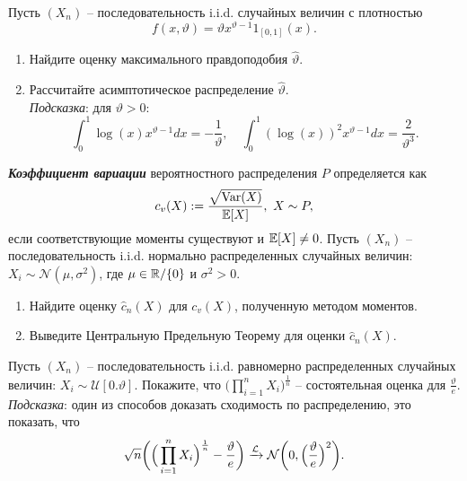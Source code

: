\begin{exc}
	Пусть $(X_n)$ -- последовательность i.i.d. случайных величин с плотностью
	\[ f(x, \vartheta) = \vartheta x^{\vartheta - 1} 1_{[0, 1]}(x). \]
	\begin{enumerate}
		\item Найдите оценку максимального правдоподобия $\hat{\vartheta}$.
		\item Рассчитайте асимптотическое распределение $\hat{\vartheta}$. \\
		\textit{Подсказка}: для $\vartheta > 0$:
		\[ \int_{0}^{1} \log(x) x^{\vartheta - 1} dx = -\frac{1}{\vartheta}, \quad \int_{0}^{1} (\log(x))^2x^{\vartheta - 1}dx = \frac{2}{\vartheta^3}.  \]
	\end{enumerate}
\end{exc}

\begin{exc}
	\textbf{\textit{Коэффициент вариации}} вероятностного распределения $P$ определяется как
	\[ c_v(X) := \frac{\sqrt{\mathrm{Var}(X)}}{\mathbb{E}[X]},\ X \sim P, \]
	если соответствующие моменты существуют и $\mathbb{E}[X] \neq 0$. Пусть $(X_n)$ -- последовательность i.i.d. нормально распределенных случайных величин: $X_i \sim \mathcal{N}(\mu, \sigma^2)$, где $\mu \in \mathbb{R} / \{0\}$ и $\sigma^2 > 0$.
	\begin{enumerate}
		\item Найдите оценку $\hat{c}_n(X)$ для $c_v(X)$, полученную методом моментов.
		\item Выведите Центральную Предельную Теорему для оценки $\hat{c}_n(X)$.
	\end{enumerate}
\end{exc}

\begin{exc}
	Пусть $(X_n)$ -- последовательность i.i.d. равномерно распределенных случайных величин: $X_i \sim \mathcal{U}[0. \vartheta]$. Покажите, что $\big(\prod_{i=1}^{n} X_i \big)^{\frac{1}{n}}$ -- состоятельная оценка для $\frac{\vartheta}{e}$.\\
	\subitem \textit{Подсказка}: один из способов доказать сходимость по распределению, это показать, что
	\[ \sqrt{n} \bigg(\Big(\prod_{i=1}^{n} X_i \Big)^{\frac{1}{n}} - \frac{\vartheta}{e} \bigg) \xrightarrow{\mathcal{L}} \mathcal{N}\bigg(0, \Big(\frac{\vartheta}{e} \Big)^2\bigg). \]
\end{exc}

